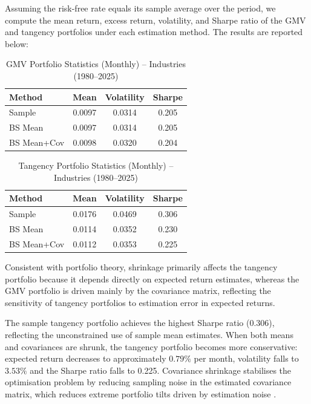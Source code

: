\documentclass[11pt]{exam}
\begin{document}
Assuming the risk-free rate equals its sample average over the period, we compute the mean return, excess return, volatility, and Sharpe ratio of the GMV and tangency portfolios under each estimation method. The results are reported below:

\begin{table}[H]
\centering
\caption{ GMV Portfolio Statistics (Monthly) -- Industries (1980--2025)}
\label{tab:q2_gmv}
\begin{tabular}{lccc}
\toprule
Method & Mean & Volatility & Sharpe \\
\midrule
Sample      & 0.0097 & 0.0314 & 0.205 \\
BS Mean     & 0.0097 & 0.0314 & 0.205 \\
BS Mean+Cov & 0.0098 & 0.0320 & 0.204 \\
\bottomrule
\end{tabular}
\end{table}

\begin{table}[H]
\centering
\caption{Tangency Portfolio Statistics (Monthly) -- Industries (1980--2025)}
\label{tab:q2_tan}
\begin{tabular}{lccc}
\toprule
Method & Mean & Volatility & Sharpe \\
\midrule
Sample      & 0.0176 & 0.0469 & 0.306 \\
BS Mean     & 0.0114 & 0.0352 & 0.230 \\
BS Mean+Cov & 0.0112 & 0.0353 & 0.225 \\
\bottomrule
\end{tabular}
\end{table}

\noindent Consistent with portfolio theory, shrinkage primarily affects the tangency portfolio because it depends directly on expected return estimates, whereas the GMV portfolio is driven mainly by the covariance matrix, reflecting the sensitivity of tangency portfolios to estimation error in expected returns. 

\noindent The sample tangency portfolio achieves the highest Sharpe ratio (0.306), reflecting the unconstrained use of sample mean estimates. When both means and covariances are shrunk, the tangency portfolio becomes more conservative: expected return decreases to approximately $0.79\%$  per month, volatility falls to $3.53\%$ and the Sharpe ratio falls to 0.225. Covariance shrinkage stabilises the optimisation problem by reducing sampling noise in the estimated covariance matrix, which reduces extreme portfolio tilts driven by estimation noise \parencite{LedoitWolf2004}.
\end{document}
